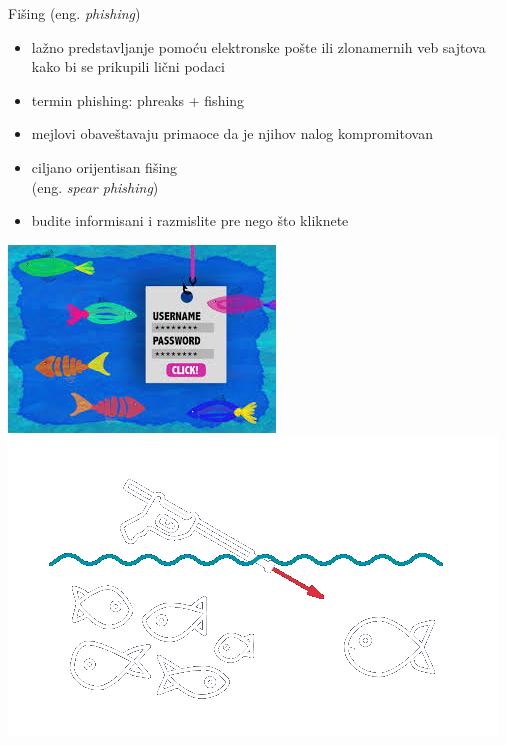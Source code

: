     \begin{frame}{Fišing (eng. \textit{phishing})}
        
        \noindent\begin{minipage}{0.55\linewidth}
            \begin{itemize}
                \item lažno predstavljanje pomoću elektronske pošte ili zlonamernih veb sajtova kako bi se prikupili lični podaci
                \item termin phishing: phreaks + fishing
                \item mejlovi obaveštavaju primaoce da je njihov nalog kompromitovan
                \item ciljano orijentisan fišing \\(eng. \textit{spear phishing})
                \item budite informisani i razmislite pre nego što kliknete
            \end{itemize}
        \end{minipage}
        \hfill
        \begin{minipage}[t]{0.4\linewidth}
            \centering
            \includegraphics[scale = 0.3]{images/phishing1.jpeg}
            \vspace{0.5cm}
            \includegraphics[scale = 0.3]{images/spear_phishing_transparent.png}
        \end{minipage}
    \end{frame}
    
